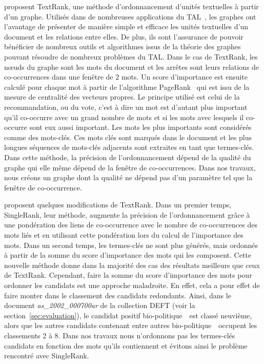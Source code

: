      proposent TextRank, une méthode
    d'ordonnancement d'unités textuelles à partir d'un graphe. Utilisés dans de
    nombreuses applications du TAL~\cite{kozareva2013textgraphs}, les graphes
    ont l'avantage de présenter de manière simple et efficace les unités
    textuelles d'un document et les relations entre elles. De plus, ils sont
    l'assurance de pouvoir bénéficier de nombreux outils et algorithmes issus de
    la théorie des graphes pouvant résoudre de nombreux problèmes du TAL. Dans
    le cas de TextRank, les n\oe{}uds du graphe sont les mots du document et les
    arrêtes sont leurs relations de co-occurrences dans une fenêtre de 2 mots.
    Un score d'importance est ensuite calculé pour chaque mot à partir de
    l'algorithme PageRank~\cite{brin1998pagerank} qui est issu de la mesure de
    centralité des vecteurs propres. Le principe utilisé est celui de la
    recommandation, ou du vote, c'est à dire un mot est d'autant plus important
    qu'il co-occurre avec un grand nombre de mots et si les mots avec lesquels
    il co-occurre sont eux aussi important. Les mots les plus importants sont
    considérés comme des mots-clés. Ces mots clés sont marqués dans le document
    et les plus longues séquences de mots-clés adjacents sont extraites en tant
    que termes-clés. Dans cette méthode, la précision de l'ordonnancement dépend
    de la qualité du graphe qui elle même dépend de la fenêtre de
    co-occurrences. Dans nos travaux, nous créons un graphe dont la qualité ne
    dépend pas d'un paramètre tel que la fenêtre de co-occurrence.

     proposent quelques modifications de TextRank.
    Dans un premier temps, SingleRank, leur méthode, augmente la précision de
    l'ordonnancement grâce à une pondération des liens de co-occurrence avec le
    nombre de co-occurrences des mots liés et en utilisant cette pondération
    lors du calcul de l'importance des mots.
    Dans un second temps, les termes-clés ne sont plus générés, mais ordonnés à
    partir de la somme du score d'importance des mots qui les composent. Cette
    nouvelle méthode donne dans la majorité des cas des résultats meilleurs que
    ceux de TextRank. Cependant, faire la somme du score d'importance des
    mots pour ordonner les candidats est une approche maladroite. En effet, cela
    a pour effet de faire monter dans le classement des candidats redondants.
    Ainsi, dans le document \textit{as\_2002\_000700ar} de la collection DEFT
    (voir la section~\ref{sec:evaluation}), le candidat positif
    \og bio-politique~\fg\ est classé neuvième, alors que les autres candidats
    contenant entre autres \og bio-politique~\fg\ occupent les classements 2 à
    8. Dans nos travaux nous n'ordonnons pas les termes-clés candidats en
    fonction des mots qu'ils contiennent et évitons ainsi le problème rencontré
    avec SingleRank.

